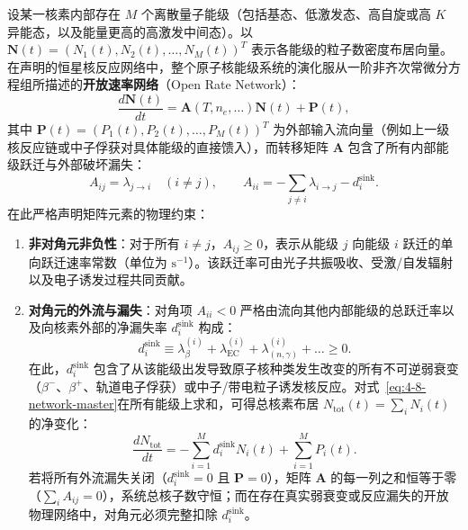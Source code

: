 设某一核素内部存在 $M$ 个离散量子能级（包括基态、低激发态、高自旋或高 $K$ 异能态，以及能量更高的高激发中间态）。以 $\mathbf{N}(t) = (N_1(t), N_2(t), \dots, N_M(t))^T$ 表示各能级的粒子数密度布居向量。在声明的恒星核反应网络中，整个原子核能级系统的演化服从一阶非齐次常微分方程组所描述的\textbf{开放速率网络}（Open Rate Network）：
\begin{equation}\label{eq:4-8-network-master}
\frac{d \mathbf{N}(t)}{dt} = \mathbf{A}(T, n_e, \dots) \mathbf{N}(t) + \mathbf{P}(t),
\end{equation}
其中 $\mathbf{P}(t) = (P_1(t), P_2(t), \dots, P_M(t))^T$ 为外部输入流向量（例如上一级核反应链或中子俘获对具体能级的直接馈入），而转移矩阵 $\mathbf{A}$ 包含了所有内部能级跃迁与外部破坏漏失：
\begin{equation}\label{eq:4-8-matrix-elements}
A_{ij} = \lambda_{j \to i} \quad (i \ne j), \qquad
A_{ii} = -\sum_{j \ne i} \lambda_{i \to j} - d_i^{\mathrm{sink}}.
\end{equation}
在此严格声明矩阵元素的物理约束：
\begin{enumerate}
\item \textbf{非对角元非负性}：对于所有 $i \ne j$，$A_{ij} \ge 0$，表示从能级 $j$ 向能级 $i$ 跃迁的单向跃迁速率常数（单位为 $\mathrm{s}^{-1}$）。该跃迁率可由光子共振吸收、受激/自发辐射以及电子诱发过程共同贡献。
\item \textbf{对角元的外流与漏失}：对角项 $A_{ii} < 0$ 严格由流向其他内部能级的总跃迁率以及向核素外部的净漏失率 $d_i^{\mathrm{sink}}$ 构成：
\begin{equation}\label{eq:4-8-sink-def}
d_i^{\mathrm{sink}} \equiv \lambda_{\beta}^{(i)} + \lambda_{\mathrm{EC}}^{(i)} + \lambda_{(n,\gamma)}^{(i)} + \dots \ge 0.
\end{equation}
在此，$d_i^{\mathrm{sink}}$ 包含了从该能级出发导致原子核种类发生改变的所有不可逆弱衰变（$\beta^-$、$\beta^+$、轨道电子俘获）或中子/带电粒子诱发核反应。对式~\eqref{eq:4-8-network-master}在所有能级上求和，可得总核素布居 $N_{\mathrm{tot}}(t) = \sum_i N_i(t)$ 的净变化：
\begin{equation}\label{eq:4-8-total-pop-rate}
\frac{d N_{\mathrm{tot}}}{dt} = -\sum_{i=1}^M d_i^{\mathrm{sink}} N_i(t) + \sum_{i=1}^M P_i(t).
\end{equation}
若将所有外流漏失关闭（$d_i^{\mathrm{sink}} = 0$ 且 $\mathbf{P} = 0$），矩阵 $\mathbf{A}$ 的每一列之和恒等于零（$\sum_i A_{ij} = 0$），系统总核子数守恒；而在存在真实弱衰变或反应漏失的开放物理网络中，对角元必须完整扣除 $d_i^{\mathrm{sink}}$。
\end{enumerate}

